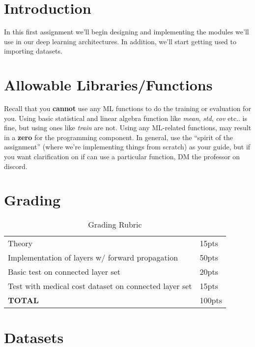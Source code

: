 \documentclass[12pt]{article}
\begin{document}
\maketitle


\section*{Introduction}
In this first assignment we'll begin designing and implementing the modules we'll use in our deep learning architectures.  In addition, we'll start getting used to importing datasets.

\section*{Allowable Libraries/Functions}
Recall that you \textbf{cannot} use any ML functions to do the training or evaluation for you.  Using basic statistical and linear algebra function like \emph{mean}, \emph{std}, \emph{cov} etc.. is fine, but using ones like \emph{train} are not. Using any ML-related functions, may result in a \textbf{zero} for the programming component.  In general, use the ``spirit of the assignment'' (where we're implementing things from scratch) as your guide, but if you want clarification on if can use a particular function, DM the professor on discord.


\section*{Grading}
\begin{table}[h]
\begin{center}
\begin{tabular}{|l|l|}
\hline
Theory & 15pts\\
Implementation of layers w/ forward propagation & 50pts\\
Basic test on connected layer set & 20pts\\
Test with medical cost dataset on connected layer set & 15pts\\
\hline
\textbf{TOTAL} & 100pts \\
\hline
\end{tabular}
\caption{Grading Rubric}
\end{center}
\end{table}

\newpage
\section*{Datasets}
\end{document}
